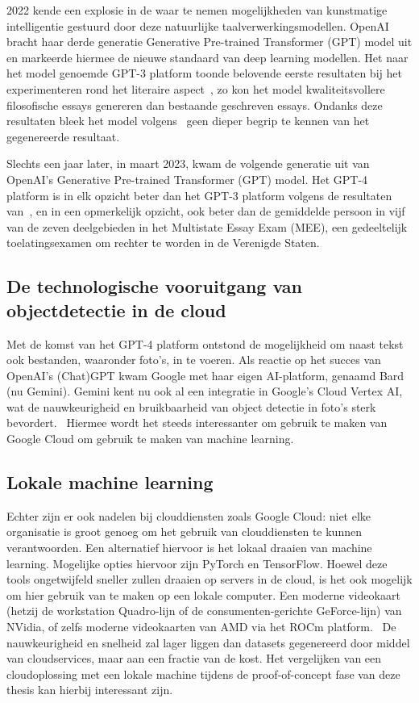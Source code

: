 2022 kende een explosie in de waar te nemen mogelijkheden van kunstmatige intelligentie gestuurd door deze natuurlijke taalverwerkingsmodellen.
OpenAI bracht haar derde generatie Generative Pre-trained Transformer (GPT) model uit en markeerde hiermee de nieuwe standaard van deep learning modellen.
Het naar het model genoemde GPT-3 platform toonde belovende eerste resultaten bij het experimenteren rond het literaire aspect~\autocite{Elkins2020}, zo kon het model kwaliteitsvollere filosofische essays genereren dan bestaande geschreven essays.
Ondanks deze resultaten bleek het model volgens~\textcite{Floridi2020} geen dieper begrip te kennen van het gegenereerde resultaat.

Slechts een jaar later, in maart 2023, kwam de volgende generatie uit van OpenAI's Generative Pre-trained Transformer (GPT) model.
Het GPT-4 platform is in elk opzicht beter dan het GPT-3 platform volgens de resultaten van~\textcite{Katz2023}, en in een opmerkelijk opzicht, ook beter dan de gemiddelde persoon in vijf van de zeven deelgebieden in het Multistate Essay Exam (MEE), een gedeeltelijk toelatingsexamen om rechter te worden in de Verenigde Staten.

\subsection{De technologische vooruitgang van objectdetectie in de cloud}
\label{subsec:effect-objectdetectie-cloud}
Met de komst van het GPT-4 platform ontstond de mogelijkheid om naast tekst ook bestanden, waaronder foto's, in te voeren.
Als reactie op het succes van OpenAI's (Chat)GPT kwam Google met haar eigen AI-platform, genaamd Bard (nu Gemini).
Gemini kent nu ook al een integratie in Google's Cloud Vertex AI, wat de nauwkeurigheid en bruikbaarheid van object detectie in foto's sterk bevordert.~\autocite{GoogleCloud2024}
Hiermee wordt het steeds interessanter om gebruik te maken van Google Cloud om gebruik te maken van machine learning.

\subsection{Lokale machine learning}
\label{subsec:benefits-hmd}
Echter zijn er ook nadelen bij clouddiensten zoals Google Cloud: niet elke organisatie is groot genoeg om het gebruik van clouddiensten te kunnen verantwoorden.
Een alternatief hiervoor is het lokaal draaien van machine learning.
Mogelijke opties hiervoor zijn PyTorch en TensorFlow.
Hoewel deze tools ongetwijfeld sneller zullen draaien op servers in de cloud, is het ook mogelijk om hier gebruik van te maken op een lokale computer.
Een moderne videokaart (hetzij de workstation Quadro-lijn of de consumenten-gerichte GeForce-lijn) van NVidia, of zelfs moderne videokaarten van AMD via het ROCm platform.~\autocite{AMD2024}
De nauwkeurigheid en snelheid zal lager liggen dan datasets gegenereerd door middel van cloudservices, maar aan een fractie van de kost.
Het vergelijken van een cloudoplossing met een lokale machine tijdens de proof-of-concept fase van deze thesis kan hierbij interessant zijn.

